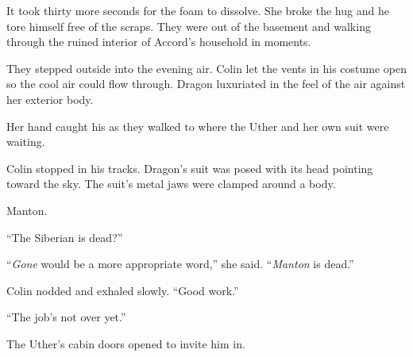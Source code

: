 It took thirty more seconds for the foam to dissolve.  She broke the hug and he tore himself free of the scraps.  They were out of the basement and walking through the ruined interior of Accord's household in moments.



They stepped outside into the evening air.  Colin let the vents in his costume open so the cool air could flow through.  Dragon luxuriated in the feel of the air against her exterior body.



Her hand caught his as they walked to where the Uther and her own suit were waiting.



Colin stopped in his tracks.  Dragon's suit was posed with its head pointing toward the sky.  The suit's metal jaws were clamped around a body.



Manton.



``The Siberian is dead?''



``\emph{Gone} would be a more appropriate word,'' she said.  ``\emph{Manton} is dead.''



Colin nodded and exhaled slowly.  ``Good work.''



``The job's not over yet.''



The Uther's cabin doors opened to invite him in.





